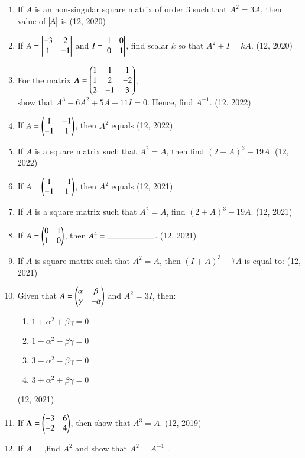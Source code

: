 \begin{enumerate}[label=\thesubsection.\arabic*,ref=\thesubsection.\theenumi]
\item If $A$ is an non-singular square matrix  of order $3$ such that $A^2=3A$, then value of $\begin{vmatrix}A\end{vmatrix}$ is
\hfill (12, 2020)
\item If $A=\begin{vmatrix}-3&2\\ 1&-1\end{vmatrix}$ and $I=\begin{vmatrix}1&0\\ 0&1\end{vmatrix}$, find scalar $k$ so that $A^2+I=kA$.
\hfill (12, 2020)
\item For the matrix $A = \begin{pmatrix}1&1&1\\1&2&-2\\2&-1&3\end{pmatrix}$, \\show that $A^3 -6A^2 + 5A +11I = 0$. Hence, find $A^{-1}$.
\hfill (12, 2022)
\item If $A=\begin{pmatrix}1&-1\\-1&1\end{pmatrix}$, then $A^2$ equals 
\hfill (12, 2022)
\item If $A$ is a square matrix such that $A^2=A$, then find $(2+A)^3 -19A$.
\hfill (12, 2022)
    \item If $A = \begin{pmatrix}1 & -1 \\ -1 & 1\end{pmatrix}$, then $A^2$ equals
\hfill (12, 2021)
    \item If $A$ is a square matrix such that $A^2 = A$, find $(2+A)^3 - 19A$.
\hfill (12, 2021)
    \item If $A = \begin{pmatrix}0 & 1 \\ 1 & 0\end{pmatrix}$, then $A^4 = \rule{2cm}{0.15mm}$.
\hfill (12, 2021)
    \item If $A$ is square matrix such that $A^2 = A$, then $(I + A)^3 - 7A$ is equal to:
\hfill (12, 2021)
    \item Given that $A = \begin{pmatrix}\alpha & \beta \\ \gamma & -\alpha\end{pmatrix}$ and $A^2 = 3I$, then:
    \begin{enumerate}
        \item $1 + \alpha^2 + \beta\gamma = 0$
        \item $1 - \alpha^2 - \beta\gamma = 0$
        \item $3 - \alpha^2 - \beta\gamma = 0$
        \item $3 + \alpha^2 + \beta\gamma = 0$
    \end{enumerate}
\hfill (12, 2021)
\item If $\mathbf{A} = \begin{pmatrix}-3&6\\-2&4\end{pmatrix}$, then show that $A^3= A$.
\hfill (12, 2019)
\item If $A$ =  ,find $A^{2}$ and show that $A^{2} = A^{-1}$ .

\end{enumerate}
